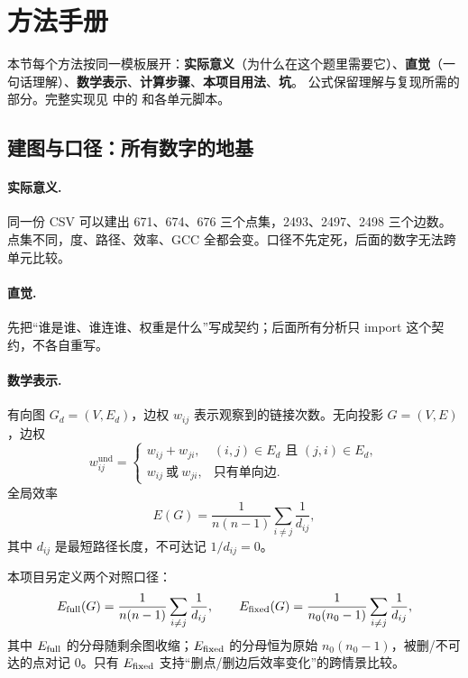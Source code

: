 \section{方法手册}

\noindent
本节每个方法按同一模板展开：\textbf{实际意义}（为什么在这个题里需要它）、\textbf{直觉}（一句话理解）、\textbf{数学表示}、\textbf{计算步骤}、\textbf{本项目用法}、\textbf{坑}。
公式保留理解与复现所需的部分。完整实现见  中的  和各单元脚本。

\subsection{建图与口径：所有数字的地基}

\paragraph{实际意义.}
同一份 CSV 可以建出 671、674、676 三个点集，2493、2497、2498 三个边数。点集不同，度、路径、效率、GCC 全都会变。口径不先定死，后面的数字无法跨单元比较。

\paragraph{直觉.}
先把“谁是谁、谁连谁、权重是什么”写成契约；后面所有分析只 import 这个契约，不各自重写。

\paragraph{数学表示.}
有向图 \(G_d=(V,E_d)\)，边权 \(w_{ij}\) 表示观察到的链接次数。无向投影 \(G=(V,E)\)，边权
\[
w_{ij}^{\mathrm{und}}=\begin{cases}
w_{ij}+w_{ji}, & (i,j)\in E_d \text{ 且 } (j,i)\in E_d,\\
w_{ij}\ \text{或}\ w_{ji}, & \text{只有单向边}.
\end{cases}
\]
全局效率
\[
E(G)=\frac{1}{n(n-1)}\sum_{i\ne j}\frac{1}{d_{ij}},
\]
其中 \(d_{ij}\) 是最短路径长度，不可达记 \(1/d_{ij}=0\)。

本项目另定义两个对照口径：
\[
E_{\mathrm{full}}(G)=\frac{1}{n(n-1)}\sum_{i\ne j}\frac{1}{d_{ij}},\qquad
E_{\mathrm{fixed}}(G)=\frac{1}{n_0(n_0-1)}\sum_{i\ne j}\frac{1}{d_{ij}},
\]
其中 \(E_{\mathrm{full}}\) 的分母随剩余图收缩；\(E_{\mathrm{fixed}}\) 的分母恒为原始 \(n_0(n_0-1)\)，被删/不可达的点对记 0。只有 \(E_{\mathrm{fixed}}\) 支持“删点/删边后效率变化”的跨情景比较。

